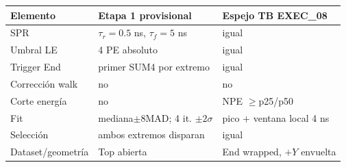 \begin{tabular}{p{}p{}p{}}\toprule
Elemento & Etapa 1 provisional & Espejo TB EXEC\_08\\\midrule
SPR & $\tau_r=0.5$ ns, $\tau_f=5$ ns & igual\\
Umbral LE & 4 PE absoluto & igual\\
Trigger End & primer SUM4 por extremo & igual\\
Corrección walk & no & no\\
Corte energía & no & NPE $\geq$p25/p50\\
Fit & mediana$\pm8$MAD; 4 it. $\pm2\sigma$ & pico + ventana local 4 ns\\
Selección & ambos extremos disparan & igual\\
Dataset/geometría & Top abierta & End wrapped, $+Y$ envuelta\\
\bottomrule\end{tabular}
